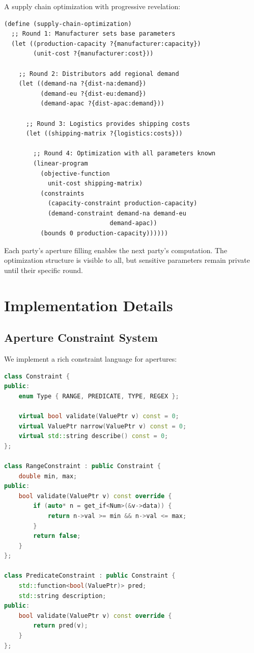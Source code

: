 \documentclass[12pt]{article}
\begin{document}
A supply chain optimization with progressive revelation:

\begin{lstlisting}
(define (supply-chain-optimization)
  ;; Round 1: Manufacturer sets base parameters
  (let ((production-capacity ?{manufacturer:capacity})
        (unit-cost ?{manufacturer:cost}))
    
    ;; Round 2: Distributors add regional demand
    (let ((demand-na ?{dist-na:demand})
          (demand-eu ?{dist-eu:demand})
          (demand-apac ?{dist-apac:demand}))
      
      ;; Round 3: Logistics provides shipping costs
      (let ((shipping-matrix ?{logistics:costs}))
        
        ;; Round 4: Optimization with all parameters known
        (linear-program
          (objective-function 
            unit-cost shipping-matrix)
          (constraints
            (capacity-constraint production-capacity)
            (demand-constraint demand-na demand-eu 
                             demand-apac))
          (bounds 0 production-capacity))))))
\end{lstlisting}

Each party's aperture filling enables the next party's computation. The optimization structure is visible to all, but sensitive parameters remain private until their specific round.

\section{Implementation Details}

\subsection{Aperture Constraint System}

We implement a rich constraint language for apertures:

\begin{lstlisting}[language=C++]
class Constraint {
public:
    enum Type { RANGE, PREDICATE, TYPE, REGEX };
    
    virtual bool validate(ValuePtr v) const = 0;
    virtual ValuePtr narrow(ValuePtr v) const = 0;
    virtual std::string describe() const = 0;
};

class RangeConstraint : public Constraint {
    double min, max;
public:
    bool validate(ValuePtr v) const override {
        if (auto* n = get_if<Num>(&v->data)) {
            return n->val >= min && n->val <= max;
        }
        return false;
    }
};

class PredicateConstraint : public Constraint {
    std::function<bool(ValuePtr)> pred;
    std::string description;
public:
    bool validate(ValuePtr v) const override {
        return pred(v);
    }
};
\end{lstlisting}
\end{document}
